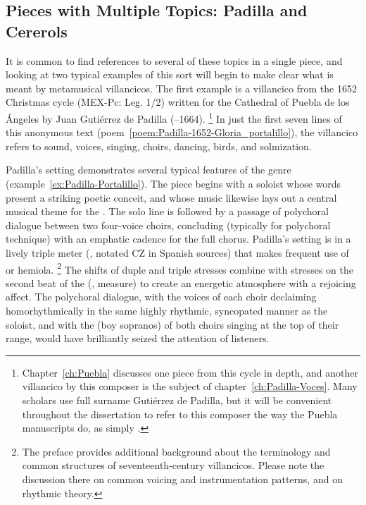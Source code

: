 \subsection{%
Pieces with Multiple Topics: Padilla and Cererols
}

It is common to find references to several of these topics in a single piece, and looking at two typical examples of this sort will begin to make clear what is meant by metamusical villancicos.
The first example is a villancico from the 1652 Christmas cycle (MEX-Pc: Leg. 1/2) written for the Cathedral of Puebla de los Ángeles by Juan Gutiérrez de Padilla (--1664).%
	\footnote{%
	Chapter~\ref{ch:Puebla} discusses one piece from this cycle in depth, and another villancico by this composer is the subject of chapter~\ref{ch:Padilla-Voces}.
	Many scholars use full surname Gutiérrez de Padilla, but it will be convenient throughout the dissertation to refer to this composer the way the Puebla manuscripts do, as simply .
	}
In just the first seven lines of this anonymous text (poem~\ref{poem:Padilla-1652-Gloria_portalillo}), the villancico refers to sound, voices, singing, choirs, dancing, birds, and solmization.

%
%
Padilla's setting demonstrates several typical features of the genre (example~\ref{ex:Padilla-Portalillo}).
The piece begins with a soloist whose words present a striking poetic conceit, and whose music likewise lays out a central musical theme for the  .
The solo line is followed by a passage of polychoral dialogue between two four-voice choirs, concluding (typically for polychoral technique) with an emphatic cadence for the full chorus.
Padilla's setting is in a lively triple meter (, notated CZ in Spanish sources) that makes frequent use of  or hemiola.%
	\footnote{%
	The preface provides additional background about the terminology and common structures of seventeenth-century villancicos.
	Please note the discussion there on common voicing and instrumentation patterns, and on rhythmic theory.
	}
The shifts of duple and triple stresses combine with stresses on the second beat of the  (, measure) to create an energetic atmosphere with a rejoicing affect.
The polychoral dialogue, with the voices of each choir declaiming homorhythmically in the same highly rhythmic, syncopated manner as the soloist, and with the  (boy sopranos) of both choirs singing at the top of their range, would have brilliantly seized the attention of listeners.

